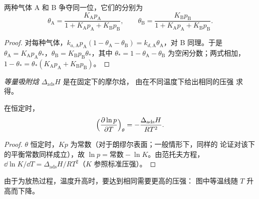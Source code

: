 \begin{proposition}[竞争吸附]\label{prop:b3:surfaces-catalysis:competitive}
两种气体 A 和 B 争夺同一位，它们的分别为
\[
  \theta_{\mathrm A} = \frac{K_{\mathrm A}p_{\mathrm A}}{1 + K_{\mathrm A}p_{\mathrm A} + K_{\mathrm B}p_{\mathrm B}}, \qquad
  \theta_{\mathrm B} = \frac{K_{\mathrm B}p_{\mathrm B}}{1 + K_{\mathrm A}p_{\mathrm A} + K_{\mathrm B}p_{\mathrm B}} .
\]
\end{proposition}

\begin{proof}
对每种气体，$k_{a,\mathrm A}p_{\mathrm A}(1 - \theta_{\mathrm A} - \theta_{\mathrm B}) = k_{d,\mathrm A}\theta_{\mathrm A}$，对 B 同理。于是
$\theta_{\mathrm A} = K_{\mathrm A}p_{\mathrm A}\theta_\ast$，$\theta_{\mathrm B} = K_{\mathrm B}p_{\mathrm B}\theta_\ast$，其中 $\theta_\ast = 1 - \theta_{\mathrm A} - \theta_{\mathrm B}$ 为空闲分数；两式相加，
$1 - \theta_\ast = \theta_\ast(K_{\mathrm A}p_{\mathrm A} + K_{\mathrm B}p_{\mathrm B})$。
\end{proof}

\begin{definition}[等量吸附焓]\label{def:b3:surfaces-catalysis:isosteric}
\emph{等量吸附焓}
$\Delta_{\mathrm{ads}}H$ 是在固定下的摩尔焓，
由在不同温度下给出相同的压强
求得。
\end{definition}

\begin{proposition}[等量吸附焓]\label{prop:b3:surfaces-catalysis:isosteric}
在恒定时，
\[
  \Bigl(\frac{\partial\ln p}{\partial T}\Bigr)_\theta = -\frac{\Delta_{\mathrm{ads}}H}{RT^2} .
\]
\end{proposition}

\begin{proof}
 $\theta$ 恒定时，$Kp$ 为常数（对于朗缪尔表面；一般情形下，同样的
论证对该下的平衡常数同样成立），故 $\ln p =
\text{常数} - \ln K$。由范托夫方程，$\dd\ln K/\dd T = \Delta_{\mathrm{ads}}H/RT^2$（$K$
参照标准压强）。
\end{proof}

由于为放热过程，温度升高时，要达到相同需要更高的压强：
图中等温线随 $T$ 升高而下降。

